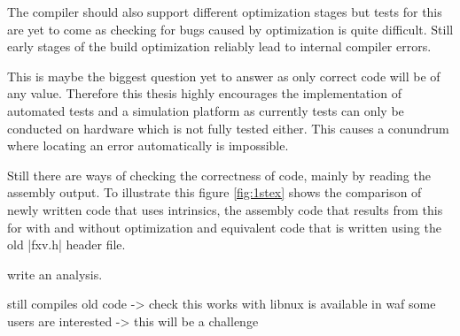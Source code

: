 The compiler should also support different optimization stages but tests for this are yet to come as checking for bugs caused by optimization is quite difficult.
Still early stages of the build optimization reliably lead to internal compiler errors.

This is maybe the biggest question yet to answer as only correct code will be of any value.
Therefore this thesis highly encourages the implementation of automated tests and a simulation platform as currently tests can only be conducted on hardware which is not fully tested either.
This causes a conundrum where locating an error automatically is impossible.

Still there are ways of checking the correctness of code, mainly by reading the assembly output.
To illustrate this figure \ref{fig:1stex} shows the comparison of newly written code that uses intrinsics, the assembly code that results from this for with and without optimization and equivalent code that is written using the old |fxv.h| header file.

write an analysis.




still compiles old code -> check this
works with libnux
is available in waf
some users are interested -> this will be a challenge

